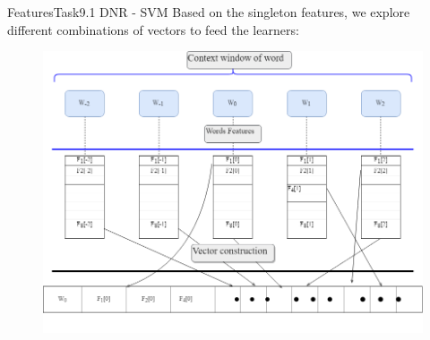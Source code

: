 \documentclass[xcolor=table]{beamer}
\begin{document}


\begin{frame}{Features}{Task9.1 DNR - SVM}
Based on the singleton features, we explore different combinations of vectors to feed the learners:
\begin{figure}
\includegraphics[scale=0.3]{VectorConstruction.png}
\end{figure}
\end{frame}

\end{document}
